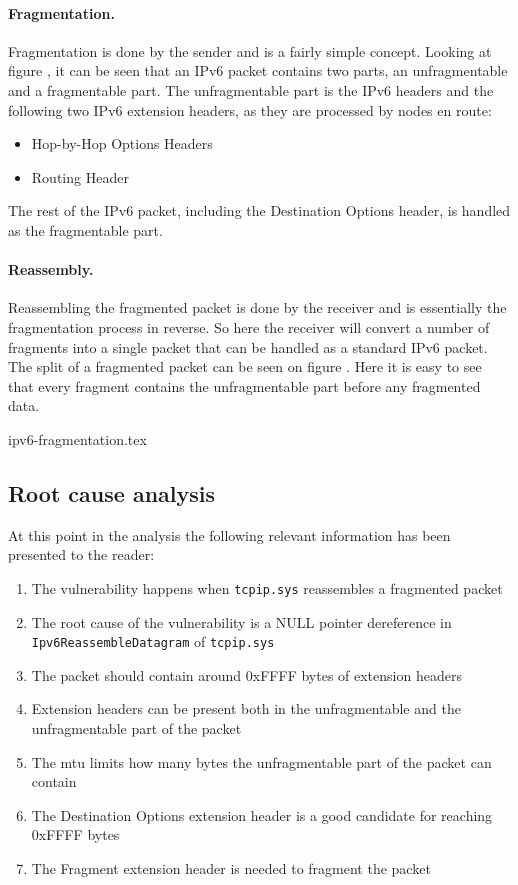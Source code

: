 \documentclass{report}
\begin{document}
\paragraph{Fragmentation.} Fragmentation is done by the sender and is a fairly simple concept. Looking at figure , it can be seen that an IPv6 packet contains two parts, an unfragmentable and a fragmentable part. The unfragmentable part is the IPv6 headers and the following two IPv6 extension headers, as they are processed by nodes en route:

\begin{itemize}
    \item Hop-by-Hop Options Headers
    \item Routing Header
\end{itemize}

The rest of the IPv6 packet, including the Destination Options header, is handled as the fragmentable part.

\paragraph{Reassembly.} Reassembling the fragmented packet is done by the receiver and is essentially the fragmentation process in reverse. So here the receiver will convert a number of fragments into a single packet that can be handled as a standard IPv6 packet. The split of a fragmented packet can be seen on figure . Here it is easy to see that every fragment contains the unfragmentable part before any fragmented data.

{ipv6-fragmentation.tex}

\subsection{Root cause analysis}
\label{sec:CVE-2021-24086:root-cause}
At this point in the analysis the following relevant information has been presented to the reader:
\begin{enumerate}
    \item The vulnerability happens when \texttt{tcpip.sys} reassembles a fragmented packet
    \item The root cause of the vulnerability is a NULL pointer dereference in \texttt{Ipv6ReassembleDatagram} of \texttt{tcpip.sys}
    \item The packet should contain around 0xFFFF bytes of extension headers
    \item Extension headers can be present both in the unfragmentable and the unfragmentable part of the packet
    \item The \gls{mtu} limits how many bytes the unfragmentable part of the packet can contain
    \item The Destination Options extension header is a good candidate for reaching 0xFFFF bytes
    \item The Fragment extension header is needed to fragment the packet
\end{enumerate}
\end{document}
